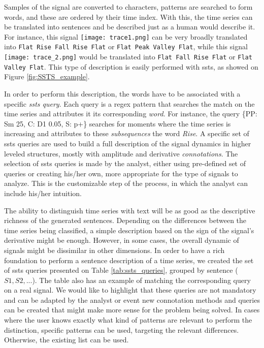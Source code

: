 Samples of the signal are converted to characters, patterns are searched to form words, and these are ordered by their time index. With this, the time series can be translated into sentences and be described just as a human would describe it. For instance, this signal \texttt{[image: trace1.png]} can be very broadly translated into \texttt{Flat Rise Fall Rise Flat} or \texttt{Flat Peak Valley Flat}, while this signal \texttt{[image: trace\_2.png]} would be translated into \texttt{Flat Fall Rise Flat} or \texttt{Flat Valley Flat}. This type of description is easily performed with \gls{ssts}, as showed on Figure \ref{fig:SSTS_example}.
\par
In order to perform this description, the words have to be associated with a specific \textit{\gls{ssts} query}. Each query is a \gls{regex} pattern that searches the match on the time series and attributes it its corresponding \textit{word}. For instance, the query \{PP: Sm 25, C: D1 0.05, S: p+\} searches for moments where the time series is increasing and attributes to these \textit{subsequences} the word \textit{Rise}. A specific set of \gls{ssts} queries are used to build a full description of the signal dynamics in higher leveled structures, mostly with amplitude and derivative \textit{connotations}. 
The selection of \gls{ssts} queries is made by the analyst, either using pre-defined set of queries or creating his/her own, more appropriate for the type of signals to analyze. This is the customizable step of the process, in which the analyst can include his/her intuition.
\par
The ability to distinguish time series with text will be as good as the descriptive richness of the generated sentences. Depending on the differences between the time series being classified, a simple description based on the sign of the signal's derivative might be enough. However, in some cases, the overall dynamic of signals might be dissimilar in other dimensions. In order to have a rich foundation to perform a sentence description of a time series, we created the set of \gls{ssts} queries presented on Table \ref{tab:ssts_queries}, grouped by sentence ($S1, S2, ...$). 
The table also has an example of matching the corresponding query on a real signal. We would like to highlight that these queries are not mandatory and can be adapted by the analyst or event new connotation methods and queries can be created that might make more sense for the problem being solved. In cases where the user knows exactly what kind of patterns are relevant to perform the distinction, specific patterns can be used, targeting the relevant differences. Otherwise, the existing list can be used.

